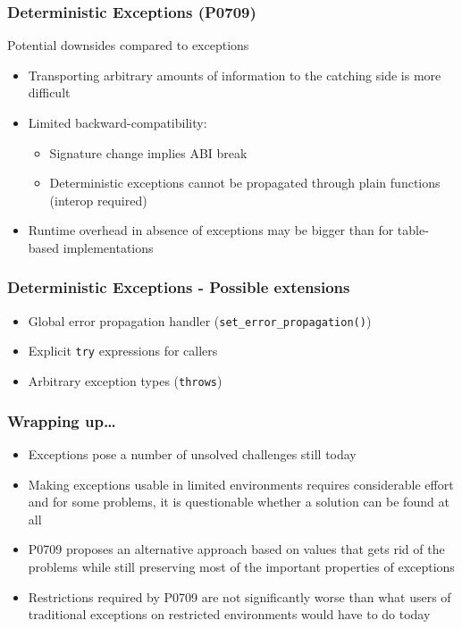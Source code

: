 \documentclass[aspectratio=169]{beamer}
\begin{document}
\begin{frame}
  \frametitle{Deterministic Exceptions (P0709)}

  Potential downsides compared to exceptions
  \begin{itemize}
  \pause \item Transporting arbitrary amounts of information to the catching side is more difficult
  \pause \item Limited backward-compatibility:
    \begin{itemize}
    \item Signature change implies ABI break
    \pause \item Deterministic exceptions cannot be propagated through plain functions (interop required)
    \end{itemize}
  \pause \item Runtime overhead in absence of exceptions may be bigger than for table-based implementations
  \end{itemize}
\end{frame}


\begin{frame}
  \frametitle{Deterministic Exceptions - Possible extensions}

  \begin{itemize}
  \item Global error propagation handler (\texttt{set\_error\_propagation()})
  \item Explicit \texttt{try} expressions for callers
  \item Arbitrary exception types (\texttt{throws})
  \end{itemize}
\end{frame}


\begin{frame}
  \frametitle{Wrapping up\ldots}

  \begin{itemize}
  \item Exceptions pose a number of unsolved challenges still today
  \item Making exceptions usable in limited environments requires considerable effort and for some problems, it is questionable whether a solution can be found at all
  \item P0709 proposes an alternative approach based on values that gets rid of the problems while still preserving most of the important properties of exceptions
  \item Restrictions required by P0709 are not significantly worse than what users of traditional exceptions on restricted environments would have to do today
  \end{itemize}
\end{frame}
\end{document}
